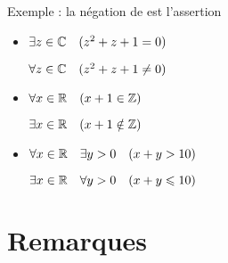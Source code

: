 \begin{frame}


\pause
\bigskip

Exemple : la négation de \assertion{$\forall x \in [1,+\infty[ \quad (x^2\ge 1)$}
est l'assertion \assertion{$\exists x \in [1,+\infty[ \quad (x^2 < 1)$}

\pause
\bigskip
{}

\pause
\bigskip

{\small
\begin{itemize}
  \item 
$\exists z \in \mathbb{C} \quad (z^2+z+1 = 0)$

$\forall z \in \mathbb{C} \quad (z^2+z+1 \neq 0)$

\pause

  \item 
$\forall x \in \mathbb{R} \quad  (x+1 \in \mathbb{Z})$

$\exists x \in \mathbb{R} \quad (x+1 \notin \mathbb{Z})$

\pause

  \item 

$\forall x \in \mathbb{R} \quad \exists y >0 \quad (x+y > 10)$ 

$\exists x \in \mathbb{R} \quad \forall y > 0 \quad (x+y \leqslant 10)$
\end{itemize} 
}

\end{frame}



\section{Remarques}

